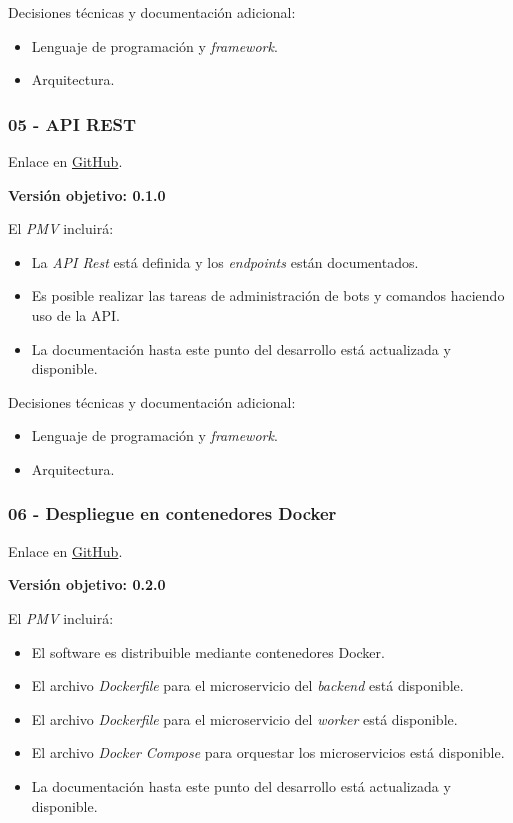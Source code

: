 Decisiones técnicas y documentación adicional:

\begin{itemize}
	\item Lenguaje de programación y \textit{framework}.
	\item Arquitectura.
\end{itemize}

\subsubsection{05 - API REST}

Enlace en \href{https://github.com/harvestcore/matroos/milestone/7}{GitHub}.

\textbf{Versión objetivo: 0.1.0}


El \textit{PMV} incluirá:

\begin{itemize}
	\item La \textit{API Rest} está definida y los \textit{endpoints} están documentados.
	\item Es posible realizar las tareas de administración de bots y comandos haciendo uso de la API.
	\item La documentación hasta este punto del desarrollo está actualizada y disponible.
\end{itemize}

Decisiones técnicas y documentación adicional:

\begin{itemize}
	\item Lenguaje de programación y \textit{framework}.
	\item Arquitectura.
\end{itemize}

\subsubsection{06 - Despliegue en contenedores Docker}

Enlace en \href{https://github.com/harvestcore/matroos/milestone/2}{GitHub}.

\textbf{Versión objetivo: 0.2.0}


El \textit{PMV} incluirá:

\begin{itemize}
	\item El software es distribuible mediante contenedores Docker.
	\item El archivo \textit{Dockerfile} para el microservicio del \textit{backend} está disponible.
	\item El archivo \textit{Dockerfile} para el microservicio del \textit{worker} está disponible.
	\item El archivo \textit{Docker Compose} para orquestar los microservicios está disponible.
	\item La documentación hasta este punto del desarrollo está actualizada y disponible.
\end{itemize}


